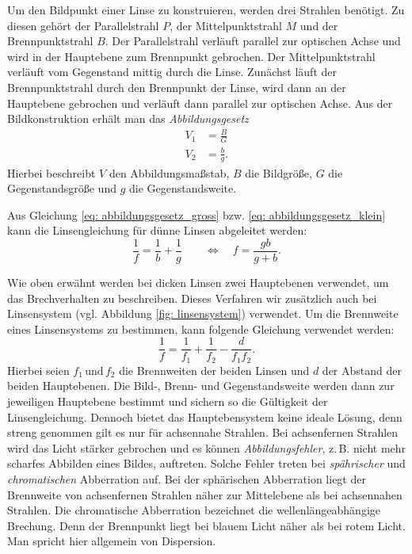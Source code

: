 Um den Bildpunkt einer Linse zu konstruieren, werden drei Strahlen benötigt.
Zu diesen gehört der Parallelstrahl $P$, der Mittelpunktstrahl $M$ und der
Brennpunktstrahl $B$.
Der Parallelstrahl verläuft parallel zur optischen Achse und wird in der Hauptebene
zum Brennpunkt gebrochen. Der Mittelpunktstrahl verläuft vom Gegenstand mittig durch die
Linse. Zunächst läuft der Brennpunktstrahl durch den Brennpunkt der Linse, wird dann
an der Hauptebene gebrochen und verläuft dann parallel zur optischen Achse.
Aus der Bildkonstruktion erhält man das \emph{Abbildungsgesetz}
\begin{align}
  V_1&=\frac{B}{G} \label{eq: abbildungsgesetz_gross} \\
  V_2&=\frac{b}{g} \label{eq: abbildungsgesetz_klein}.
\end{align}
Hierbei beschreibt $V$ den Abbildungsmaßstab, $B$ die Bildgröße, $G$ die Gegenstandsgröße
und $g$ die Gegenstandsweite.

Aus Gleichung \eqref{eq: abbildungsgesetz_gross} bzw. \eqref{eq: abbildungsgesetz_klein}
kann die Linsengleichung für dünne Linsen abgeleitet werden:
\begin{equation}
  \label{eq: linsengleichung}
  \frac{1}{f}= \frac{1}{b}+  \frac{1}{g} \qquad \Leftrightarrow \quad f= \frac{gb}{g+b}.
\end{equation}

Wie oben erwähnt werden bei dicken Linsen zwei Hauptebenen verwendet, um das Brechverhalten
zu beschreiben. Dieses Verfahren wir zusätzlich auch bei Linsensystem (vgl. Abbildung \ref{fig: linsensystem}) verwendet.
Um die Brennweite eines Linsensystems zu bestimmen, kann folgende Gleichung verwendet werden:
\begin{equation}
  \label{eq: gleichung_linsensystem}
  \frac{1}{f}=\frac{1}{f_1}+\frac{1}{f_2}-\frac{d}{f_1f_2}.
\end{equation}
Hierbei seien $f_1 \, \text{und} \, f_2$ die Brennweiten der beiden Linsen und $d$ der
Abstand der beiden Hauptebenen.
Die Bild-, Brenn- und Gegenstandsweite werden dann zur jeweiligen Hauptebene
bestimmt und sichern so die Gültigkeit der Linsengleichung.
Dennoch bietet das Hauptebensystem keine ideale Lösung, denn streng genommen
gilt es nur für achsennahe Strahlen. Bei achsenfernen Strahlen wird das Licht stärker
gebrochen und es können \emph{Abbildungsfehler}, z.\,B. nicht mehr scharfes Abbilden eines Bildes,
auftreten. Solche Fehler treten bei \emph{spährischer} und \emph{chromatischen} Abberration auf.
Bei der sphärischen Abberration liegt der Brennweite von achsenfernen Strahlen näher zur
Mittelebene als bei achsennahen Strahlen. Die chromatische Abberration bezeichnet die
wellenlängeabhängige Brechung. Denn der Brennpunkt liegt bei blauem Licht näher als
bei rotem Licht. Man spricht hier allgemein von Dispersion.

